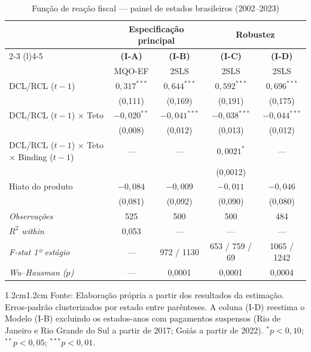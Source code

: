 \vspace{14pt}

\begin{table}[H]
\centering
\caption{Função de reação fiscal --- painel de estados brasileiros (2002--2023)}
\label{tab:resultados}
\footnotesize
\renewcommand{\arraystretch}{1.0}
\setlength{\tabcolsep}{3pt}
\begin{tabular}{lcccc}
\toprule
 & \multicolumn{2}{c}{Especificação principal} & \multicolumn{2}{c}{Robustez} \\
\cmidrule(l){2-3} \cmidrule(l){4-5}
 & \textbf{(I-A)} & \textbf{(I-B)} & \textbf{(I-C)} & \textbf{(I-D)} \\
 & MQO-EF & 2SLS & 2SLS & 2SLS \\
\midrule
DCL/RCL ($t-1$) & $0,317^{***}$ & $0,644^{***}$ & $0,592^{***}$ & $0,696^{***}$ \\
\color{gray!75} & \color{gray!75}(0,111) & \color{gray!75}(0,169) & \color{gray!75}(0,191) & \color{gray!75}(0,175) \\[3pt]
DCL/RCL ($t-1$) $\times$ Teto & $-0,020^{**}$ & $-0,041^{***}$ & $-0,038^{***}$ & $-0,044^{***}$ \\
\color{gray!75} & \color{gray!75}(0,008) & \color{gray!75}(0,012) & \color{gray!75}(0,013) & \color{gray!75}(0,012) \\[3pt]
DCL/RCL ($t-1$) $\times$ Teto $\times$ Binding ($t-1$) & --- & --- & $0,0021^{*}$ & --- \\
\color{gray!75} & & & \color{gray!75}(0,0012) & \\[3pt]
Hiato do produto & $-0,084$ & $-0,009$ & $-0,011$ & $-0,046$ \\
\color{gray!75} & \color{gray!75}(0,081) & \color{gray!75}(0,092) & \color{gray!75}(0,090) & \color{gray!75}(0,080) \\
\midrule
\textcolor{gray!70}{\textit{Observações}} & 525 & 500 & 500 & 484 \\
\textcolor{gray!70}{\textit{$R^2$ within}} & 0,053 & --- & --- & --- \\
\textcolor{gray!70}{\textit{F-stat 1º estágio}} & --- & 972 / 1130 & 653 / 759 / 69 & 1065 / 1242 \\
\textcolor{gray!70}{\textit{Wu--Hausman ($p$)}} & --- & 0,0001 & 0,0001 & 0,0004 \\
\bottomrule
\end{tabular}

\vspace{6pt}
\begin{adjustwidth}{1.2cm}{1.2cm}
\footnotesize
\noindent
Fonte: Elaboração própria a partir dos resultados da estimação. Erros-padrão clusterizados por estado entre parênteses. A coluna (I-D) reestima o Modelo (I-B) excluindo os estados-anos com pagamentos suspensos (Rio de Janeiro e Rio Grande do Sul a partir de 2017; Goiás a partir de 2022). $^{*}p < 0{,}10$; $^{**}p < 0{,}05$; $^{***}p < 0{,}01$.
\end{adjustwidth}

\end{table}

\vspace{14pt}